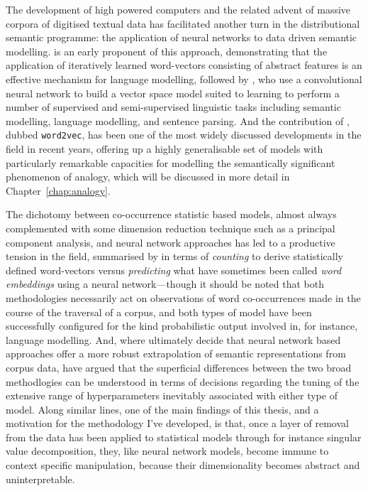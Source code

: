 The development of high powered computers and the related advent of massive corpora of digitised textual data has facilitated another turn in the distributional semantic programme: the application of neural networks to data driven semantic modelling.  \cite{BengioEA2003} is an early proponent of this approach, demonstrating that the application of iteratively learned word-vectors consisting of abstract features is an effective mechanism for language modelling, followed by \cite{CollobertEA2008}, who use a convolutional neural network to build a vector space model suited to learning to perform a number of supervised and semi-supervised linguistic tasks including semantic modelling, language modelling, and sentence parsing.  And the contribution of \cite{MikolovEA2013,MikolovEA2013b,MikolovEA2013c}, dubbed \texttt{word2vec}, has been one of the most widely discussed developments in the field in recent years, offering up a highly generalisable set of models with particularly remarkable capacities for modelling the semantically significant phenomenon of analogy, which will be discussed in more detail in Chapter~\ref{chap:analogy}.

The dichotomy between co-occurrence statistic based models, almost always complemented with some dimension reduction technique such as a principal component analysis, and neural network approaches has led to a productive tension in the field, summarised by  in terms of \emph{counting} to derive statistically defined word-vectors versus \emph{predicting} what have sometimes been called \emph{word embeddings} using a neural network---though it should be noted that both methodologies necessarily act on observations of word co-occurrences made in the course of the traversal of a corpus, and both types of model have been successfully configured for the kind probabilistic output involved in, for instance, language modelling.  And, where \citeauthor{BaroniEA2014} ultimately decide that neural network based approaches offer a more robust extrapolation of semantic representations from corpus data, \cite{LevyEA2014b} have argued that the superficial differences between the two broad methodlogies can be understood in terms of decisions regarding the tuning of the extensive range of hyperparameters inevitably associated with either type of model.  Along similar lines, one of the main findings of this thesis, and a motivation for the methodology I've developed, is that, once a layer of removal from the data has been applied to statistical models through for instance singular value decomposition, they, like neural network models, become immune to context specific manipulation, because their dimensionality becomes abstract and uninterpretable.

